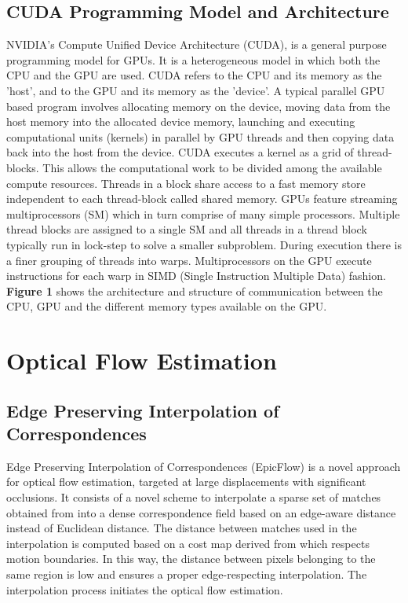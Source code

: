 \documentclass[english]{article}
\begin{document}
	\subsection{CUDA Programming Model and Architecture}
	NVIDIA’s Compute Unified Device Architecture (CUDA), is a general purpose programming model for GPUs. It is a heterogeneous model in which both the CPU and the GPU are used. CUDA refers to the CPU and its memory as the 'host', and to the GPU and its memory as the 'device'. A typical parallel GPU based program involves allocating memory on the device, moving data from the host memory into the allocated device memory, launching and executing computational units (kernels) in parallel by GPU threads and then copying data back into the host from the device. CUDA executes a kernel as a grid of thread-blocks. This allows the computational work to be divided among the available compute resources. Threads in a block share access to a fast memory store independent to each thread-block called shared memory. GPUs feature streaming multiprocessors (SM) which in turn comprise of many simple processors. Multiple thread blocks are assigned to a single SM and all threads in a thread block typically run in lock-step to solve a smaller subproblem. During execution there is a finer grouping of threads into warps. Multiprocessors on the GPU execute instructions for each warp in SIMD (Single Instruction Multiple Data) fashion. \textbf{Figure 1} shows the architecture and structure of communication between the CPU, GPU and the different memory types available on the GPU.

	\section{Optical Flow Estimation}
	\subsection{Edge Preserving Interpolation of Correspondences}
	Edge Preserving Interpolation of Correspondences (EpicFlow) \cite{1} is a novel approach for optical flow estimation, targeted at large displacements with significant occlusions. It consists of a novel scheme to interpolate a sparse set of matches obtained from \cite{3} into a dense correspondence field based on an edge-aware distance instead of Euclidean distance. The distance between matches used in the interpolation is computed based on a cost map derived from \cite{4} which respects motion boundaries. In this way, the distance between pixels belonging to the same region is low and ensures a proper edge-respecting interpolation. The interpolation process initiates the optical flow estimation.
\end{document}
